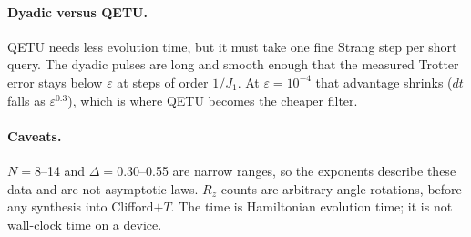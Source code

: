 \documentclass[10pt]{article}
\begin{document}
\paragraph{Dyadic versus QETU.} QETU needs less evolution time, but it must take one fine Strang step per short
query. The dyadic pulses are long and smooth enough that the measured Trotter error stays below $\varepsilon$
at steps of order $1/J_1$. At $\varepsilon=10^{-4}$ that advantage shrinks ($dt$ falls as $\varepsilon^{0.3}$),
which is where QETU becomes the cheaper filter.

\paragraph{Caveats.} $N=8$--14 and $\Delta=0.30$--0.55 are narrow ranges, so the exponents describe these data
and are not asymptotic laws. $R_z$ counts are arbitrary-angle rotations, before any synthesis into Clifford$+T$.
The time is Hamiltonian evolution time; it is not wall-clock time on a device.
\end{document}

